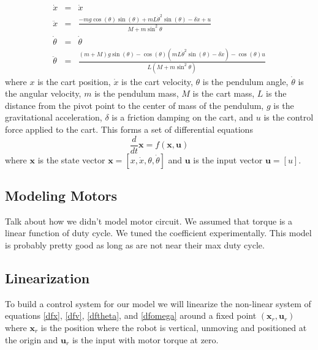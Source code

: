 \documentclass[]{article}
\newcommand{\bx}{\boldsymbol{x}}
\newcommand{\bu}{\boldsymbol{u}}
\begin{document}
\begin{eqnarray}
	\dot{x} & = & \dot{x} \label{dfx} \\ 
	\ddot{x}          & = & \frac{-mg \cos(\theta)\sin(\theta) + mL{\dot{\theta}}^2 \sin(\theta)-\delta \dot{x}+u }{M+m\sin^2\theta}  \label{dfv} \\
	\dot{\theta}  &= & \dot{\theta} \label{dftheta} \\	
	\ddot{\theta}  &= & \frac{(m+M)g\sin(\theta)-\cos(\theta)(mL{\dot{\theta}}^2\sin(\theta)-\delta \dot{x})-\cos(\theta)u}{L(M+m\sin^2\theta)} \label{dfomega}
\end{eqnarray}
where $x$ is the cart position, $\dot{x}$ is the cart velocity, $\theta$ is the pendulum angle, $\dot{\theta}$ is the angular velocity, $m$ is the pendulum mass, $M$ is the cart mass, $L$ is the distance from the pivot point to the center of mass of the pendulum, $g$ is the gravitational acceleration, $\delta$ is a friction damping on the cart, and $u$ is the control force applied to the cart. This forms a set of differential equations 
\begin{equation}
	\frac{d}{dt} \bx = f(\bx, \bu) \label{dfdx}
\end{equation}
where $\bx$ is the state vector $\bx = [x, \dot{x}, \theta, \dot{\theta}]$ and $\bu$ is the input vector $\bu=[u]$.

\subsection*{Modeling Motors}
Talk about how we didn't model motor circuit. We assumed that torque is a linear function of duty cycle.  We tuned the coefficient experimentally.  This model is probably pretty good as long as are not near their max duty cycle.

\subsection*{Linearization}
To build a control system for our model we will linearize the non-linear system of equations \eqref{dfx}, \eqref{dfv}, \eqref{dftheta}, and \eqref{dfomega} around a fixed point $(\bx_r, \bu_r)$  where $\bx_r$ is the position where the robot is vertical, unmoving and positioned at the origin and $\bu_r$ is the input with motor torque at zero.
\end{document}
